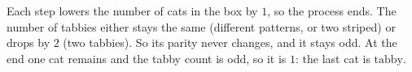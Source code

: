 Each step lowers the number of cats in the box by $1$, so the process ends. The number of tabbies either stays the same (different patterns, or two striped) or drops by $2$ (two tabbies). So its parity never changes, and it stays odd. At the end one cat remains and the tabby count is odd, so it is $1$: the last cat is $\boxed{\text{tabby}}$.
